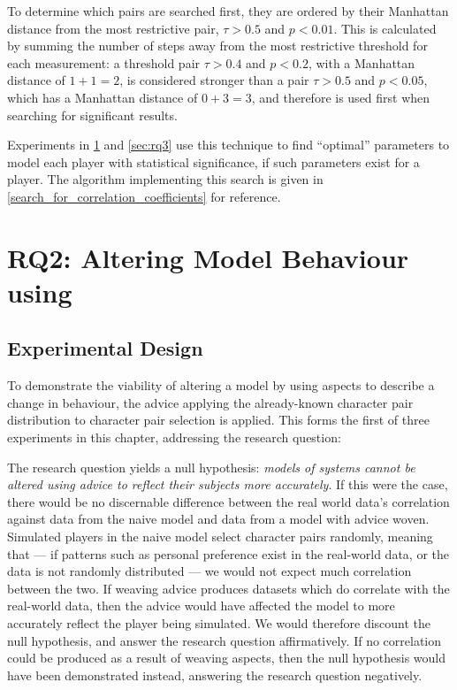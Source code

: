 To determine which pairs are searched first, they are ordered by their Manhattan
distance from the most restrictive pair, $\tau{} > 0.5$ and $p < 0.01$. This is
calculated by summing the number of steps away from the most restrictive
threshold for each measurement: a threshold pair $\tau{} > 0.4$ and $p < 0.2$,
with a Manhattan distance of $1 + 1 = 2$, is considered stronger than a pair
$\tau{} > 0.5$ and $p < 0.05$, which has a Manhattan distance of $0 + 3 = 3$,
and therefore is used first when searching for significant results.

Experiments in \cref{sec:rq2} and \cref{sec:rq3} use this technique to find
``optimal'' parameters to model each player with statistical significance, if
such parameters exist for a player. The algorithm implementing this search is
given in \cref{search_for_correlation_coefficients} for reference.



\section{RQ2: Altering Model Behaviour using \AspectOrientation}
\label{sec:rq2}

\subsection{Experimental Design}

To demonstrate the viability of altering a model by using aspects to describe a
change in behaviour, the advice applying the already-known character pair
distribution to character pair selection is applied. This forms the first of
three experiments in this chapter, addressing the research question:

\begin{researchquestion}
\rqtwo{}
\end{researchquestion}

The research question yields a null hypothesis: \emph{models of systems cannot
be altered using advice to reflect their subjects more accurately}. If this were
the case, there would be no discernable difference between the real world data's
correlation against data from the naive model and data from a model with advice
woven. Simulated players in the naive model select character pairs randomly,
meaning that --- if patterns such as personal preference exist in the real-world
data, or the data is not randomly distributed --- we would not expect much
correlation between the two. If weaving advice produces datasets which do
correlate with the real-world data, then the advice would have affected the
model to more accurately reflect the player being simulated. We would therefore
discount the null hypothesis, and answer the research question affirmatively. If
no correlation could be produced as a result of weaving aspects, then the null
hypothesis would have been demonstrated instead, answering the research question
negatively.

